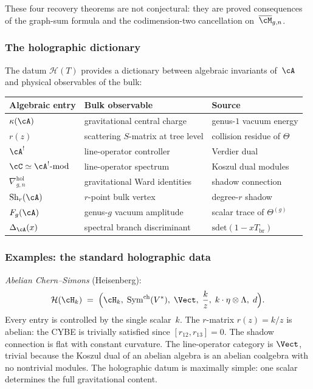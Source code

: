 These four recovery theorems are not conjectural: they are proved
consequences of the graph-sum formula and the codimension-two
cancellation on~$\overline{\cM}_{g,n}$.

\subsubsection*{The holographic dictionary}

The datum $\mathcal H(T)$ provides a dictionary between algebraic
invariants of~$\cA$ and physical observables of the bulk:
\begin{center}
\small
\renewcommand{\arraystretch}{1.15}
\begin{tabular}{lll}
\textbf{Algebraic entry} & \textbf{Bulk observable}
 & \textbf{Source} \\
\hline
$\kappa(\cA)$ & gravitational central charge
 & genus-$1$ vacuum energy \\[2pt]
$r(z)$ & scattering $S$-matrix at tree level
 & collision residue of $\Theta$ \\[2pt]
$\cA^!$ & line-operator controller
 & Verdier dual \\[2pt]
$\cC\simeq\cA^!\text{-mod}$ & line-operator spectrum
 & Koszul dual modules \\[2pt]
$\nabla^{\mathrm{hol}}_{g,n}$ & gravitational Ward identities
 & shadow connection \\[2pt]
$\mathrm{Sh}_r(\cA)$ & $r$-point bulk vertex
 & degree-$r$ shadow \\[2pt]
$F_g(\cA)$ & genus-$g$ vacuum amplitude
 & scalar trace of $\Theta^{(g)}$ \\[2pt]
$\Delta_\cA(x)$ & spectral branch discriminant
 & $\mathrm{sdet}(1-xT_{\mathrm{br}})$
\end{tabular}
\end{center}

\subsubsection*{Examples: the standard holographic data}

\noindent
\emph{Abelian Chern--Simons} (Heisenberg):
\[
\mathcal H(\cH_k)
\;=\;
\Bigl(
\cH_k,\;\mathrm{Sym}^{\mathrm{ch}}(V^*),\;\Vect,\;\frac{k}{z},\;
k\cdot\eta\otimes\Lambda,\;d
\Bigr).
\]
Every entry is controlled by the single scalar~$k$. The
$r$-matrix $r(z)=k/z$ is abelian: the CYBE is trivially
satisfied since $[r_{12},r_{13}]=0$. The shadow connection is
flat with constant curvature. The line-operator category is
$\Vect$, trivial because the Koszul dual of an abelian algebra
is an abelian coalgebra with no nontrivial modules. The
holographic datum is maximally simple: one scalar determines the
full gravitational content.

